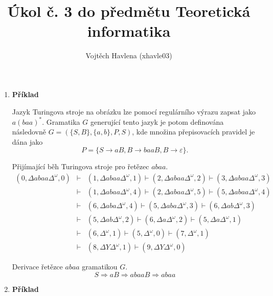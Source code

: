 \documentclass[a4paper,12pt]{article}
\title{Úkol č. 3 do předmětu Teoretická informatika}
\author{Vojtěch Havlena (xhavle03)}
\date{}
\begin{document}
\maketitle


\begin{enumerate}[label=\textbf{\arabic*}.]

 \item {\bfseries Příklad}
 
 Jazyk Turingova stroje na obrázku lze pomocí regulárního výrazu zapsat jako $a(baa)^*$. Gramatika
 $G$ generující tento jazyk je potom definována následovně $G = (\{S, B\}, \{a, b\}, P, S)$, kde
 množina přepisovacích pravidel je dána jako $$P = \{S \rightarrow aB, B\rightarrow baaB, B\rightarrow\varepsilon\}.$$
 
 Přijímající běh Turingova stroje pro řetězec $abaa$.
 \begin{eqnarray*}
   (0, \Delta abaa\Delta^{\omega}, 0) &\vdash& (1, \Delta abaa\Delta^{\omega}, 1) \vdash (2, \Delta abaa\Delta^{\omega}, 2) 
   \vdash (3, \Delta abaa\Delta^{\omega}, 3) \\
   &\vdash& (1, \Delta abaa\Delta^{\omega}, 4) \vdash (2, \Delta abaa\Delta^{\omega}, 5) 
   \vdash (5, \Delta abaa\Delta^{\omega}, 4) \\ &\vdash& (6, \Delta aba\Delta^{\omega}, 4) \vdash (5, \Delta aba\Delta^{\omega}, 3)
   \vdash (6, \Delta ab\Delta^{\omega}, 3) \\ &\vdash& (5, \Delta ab\Delta^{\omega}, 2) \vdash (6, \Delta a\Delta^{\omega}, 2)
   \vdash (5, \Delta a\Delta^{\omega}, 1) \\ &\vdash& (6, \Delta^{\omega}, 1) 
   \vdash (5, \Delta^{\omega}, 0) \vdash (7, \Delta^{\omega}, 1) \\
   &\vdash& (8, \Delta Y\Delta^{\omega}, 1) \vdash (9, \Delta Y\Delta^{\omega}, 0) 
 \end{eqnarray*}
 
 Derivace řetězce $abaa$ gramatikou $G$.
 $$
  S \Rightarrow aB \Rightarrow abaaB \Rightarrow abaa
 $$


\item {\bfseries Příklad}
 

\end{enumerate}
\end{document}
